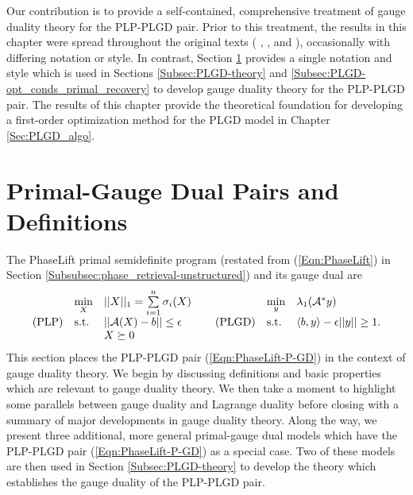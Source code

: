 Our contribution is to provide a self-contained, comprehensive treatment of gauge duality theory for the PLP-PLGD pair.  
Prior to this treatment, the results in this chapter were spread throughout the original texts ( \hspace{-0.24cm} \cite{rockafellar1970convex}, \cite{DBLP:journals/siamjo/FriedlanderMP14}, and \cite{DBLP:journals/siamsc/FriedlanderM16}), occasionally with differing notation or style.  
In contrast, Section \ref{Subsec:PLGD-models_intro} provides a single notation and style which is used in Sections \ref{Subsec:PLGD-theory} and \ref{Subsec:PLGD-opt_conds_primal_recovery} to develop gauge duality theory for the PLP-PLGD pair.  
The results of this chapter provide the theoretical foundation for developing a first-order optimization method for the PLGD model in Chapter \ref{Sec:PLGD_algo}.


\section{Primal-Gauge Dual Pairs and Definitions}		\label{Subsec:PLGD-models_intro}



The PhaseLift primal semidefinite program (restated from (\ref{Eqn:PhaseLift}) in Section \ref{Subsubsec:phase_retrieval-unstructured}) and its gauge dual are
\begin{equation} \label{Eqn:PhaseLift-P-GD}
\begin{array}{lllllll}
	&	\min\limits_{\substack{X}}
		&	||X||_1 = \sum\limits_{\substack{i=1}}^{\substack{n}} \sigma_i(X)
			&
				&	\min\limits_{\substack{y}}
					&	\lambda_1({\mathcal A}^* y)
						\\
\textnormal{(PLP)}
	&	\textnormal{s.t.}
		& 	|| {\mathcal A} (X) - b || \leq \epsilon
			&	\hspace{0.4cm} 	\textnormal{(PLGD)}
				&	\textnormal{s.t.}
					&	\langle b, y \rangle - \epsilon ||y|| \geq 1.
						\\

	&
		&	X \succeq 0

\end{array}
\end{equation}
This section places the PLP-PLGD pair (\ref{Eqn:PhaseLift-P-GD}) in the context of gauge duality theory.  We begin by discussing definitions and basic properties which are relevant to gauge duality theory. 
We then take a moment to highlight some parallels between gauge duality and Lagrange duality before closing with a summary of major developments in gauge duality theory.  
Along the way, we present three additional, more general primal-gauge dual models which have the PLP-PLGD pair (\ref{Eqn:PhaseLift-P-GD}) as a special case.  Two of these models are then used in Section \ref{Subsec:PLGD-theory} to develop the theory which establishes the gauge duality of the PLP-PLGD pair.




